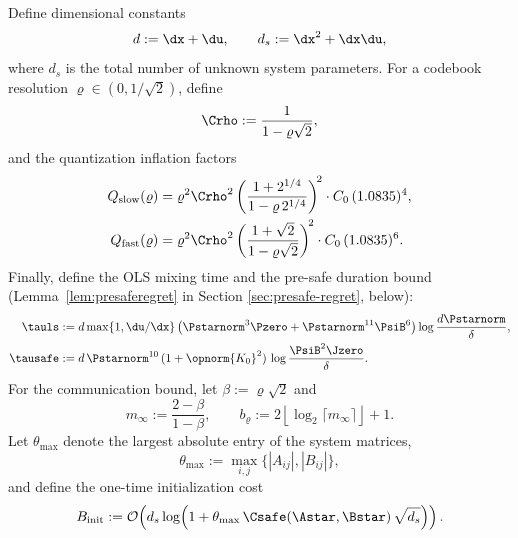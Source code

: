\documentclass[11pt,journal,onecolumn]{IEEEtran}
\begin{document}
Define dimensional constants
\begin{equation}\label{eq:ds-def}
    d := \dx + \du, \qquad d_s := \dx^2 + \dx\du,
\end{equation}
where $d_s$ is the total number of unknown system parameters. For a codebook resolution $\varrho \in (0,1/\sqrt{2})$, define
\begin{equation}\label{eq:Crho-def}
    \Crho := \frac{1}{1-\varrho\sqrt{2}},
\end{equation}
and the quantization inflation factors
\begin{align}
    Q_{\mathrm{slow}}(\varrho) &= \varrho^2 \Crho^2 \left( \frac{1+2^{1/4}}{1-\varrho\,2^{1/4}} \right)^{\!2} \cdot C_0\,(1.0835)^4, \label{eq:Qslow} \\
    Q_{\mathrm{fast}}(\varrho) &= \varrho^2 \Crho^2 \left( \frac{1+\sqrt{2}}{1-\varrho\sqrt{2}} \right)^{\!2} \cdot C_0\,(1.0835)^6. \label{eq:Qfast}
\end{align}
Finally, define the OLS mixing time and the pre-safe duration bound (Lemma~\ref{lem:presaferegret} in Section \ref{sec:presafe-regret}, below):
\begin{align}
    \tauls &:= d \max\{1, \du/\dx\} \left(\Pstarnorm^3 \Pzero + \Pstarnorm^{11} \PsiB^6\right) \log \frac{d\Pstarnorm}{\delta}, \label{eq:tauls-def} \\
    \tausafe &:= d\,\Pstarnorm^{10}\,(1+\opnorm{K_0}^2)\,\log\frac{\PsiB^2 \Jzero}{\delta}. \label{eq:tausafe-def}
\end{align}
For the communication bound, let $\beta := \varrho\sqrt{2}$ and
\begin{equation}\label{eq:m-infty-def}
    m_\infty := \frac{2 - \beta}{1 - \beta}, \qquad b_\varrho := 2\left\lfloor \log_2 \lceil m_\infty \rceil \right\rfloor + 1.
\end{equation}
Let $\theta_{\max}$ denote the largest absolute entry of the system matrices,
\begin{equation}\label{eq:theta-max-def}
    \theta_{\max} := \max_{i,j}\{|A_{ij}|, |B_{ij}|\},
\end{equation}
and define the one-time initialization cost
\begin{equation}\label{eq:Binit-def}
    B_{\mathrm{init}} := \mathcal{O}\!\left(d_s \log\!\left(1 + \theta_{\max}\, \Csafe(\Astar, \Bstar)\, \sqrt{d_s}\right)\right).
\end{equation}
\end{document}
